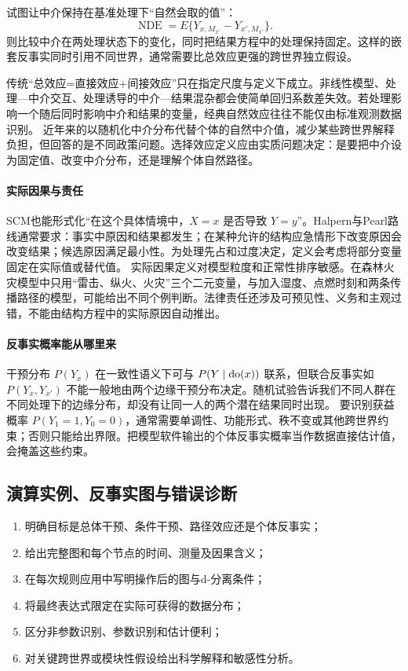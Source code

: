 试图让中介保持在基准处理下“自然会取的值”：
\[
\operatorname{NDE}=E\{Y_{x,M_{x'}}-Y_{x',M_{x'}}\}.
\]
则比较中介在两处理状态下的变化，同时把结果方程中的处理保持固定。这样的嵌套反事实同时引用不同世界，通常需要比总效应更强的跨世界独立假设。

传统“总效应=直接效应+间接效应”只在指定尺度与定义下成立。非线性模型、处理---中介交互、处理诱导的中介---结果混杂都会使简单回归系数差失效。若处理影响一个随后同时影响中介和结果的变量，经典自然效应往往不能仅由标准观测数据识别。
近年来的以随机化中介分布代替个体的自然中介值，减少某些跨世界解释负担，但回答的是不同政策问题。选择效应定义应由实质问题决定：是要把中介设为固定值、改变中介分布，还是理解个体自然路径。

\paragraph{实际因果与责任}

SCM也能形式化“在这个具体情境中，$X=x$ 是否导致 $Y=y$”。Halpern与Pearl路线通常要求：事实中原因和结果都发生；在某种允许的结构应急情形下改变原因会改变结果；候选原因满足最小性\parencite{halpern2016}。为处理先占和过度决定，定义会考虑将部分变量固定在实际值或替代值。
实际因果定义对模型粒度和正常性排序敏感。在森林火灾模型中只用“雷击、纵火、火灾”三个二元变量，与加入湿度、点燃时刻和两条传播路径的模型，可能给出不同个例判断。法律责任还涉及可预见性、义务和主观过错，不能由结构方程中的实际原因自动推出。

\paragraph{反事实概率能从哪里来}

干预分布 $P(Y_x)$ 在一致性语义下可与 $P(Y\mid\operatorname{do}(x))$ 联系，但联合反事实如 $P(Y_x,Y_{x'})$ 不能一般地由两个边缘干预分布决定。随机试验告诉我们不同人群在不同处理下的边缘分布，却没有让同一人的两个潜在结果同时出现。
要识别获益概率 $P(Y_1=1,Y_0=0)$，通常需要单调性、功能形式、秩不变或其他跨世界约束；否则只能给出界限。把模型软件输出的个体反事实概率当作数据直接估计值，会掩盖这些约束。

\subsection{演算实例、反事实图与错误诊断}

\begin{enumerate}
  \item 明确目标是总体干预、条件干预、路径效应还是个体反事实；
  \item 给出完整图和每个节点的时间、测量及因果含义；
  \item 在每次规则应用中写明操作后的图与d-分离条件；
  \item 将最终表达式限定在实际可获得的数据分布；
  \item 区分非参数识别、参数识别和估计便利；
  \item 对关键跨世界或模块性假设给出科学解释和敏感性分析。
\end{enumerate}

